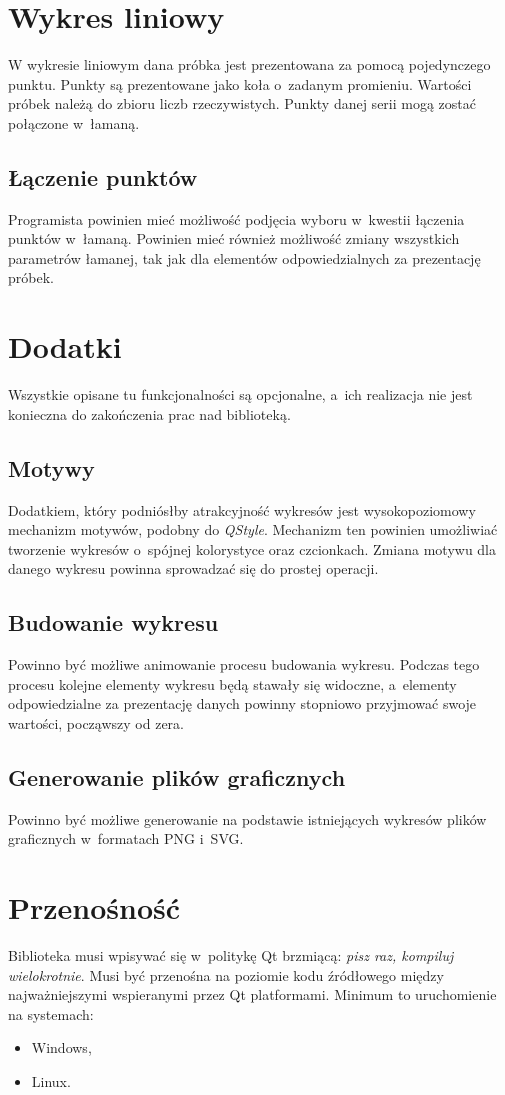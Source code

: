 \section{Wykres liniowy}
W wykresie liniowym dana próbka jest prezentowana za pomocą pojedynczego punktu. Punkty są prezentowane jako koła o~zadanym promieniu. Wartości próbek należą do zbioru liczb rzeczywistych. Punkty danej serii mogą zostać połączone w~łamaną.

\subsection{Łączenie punktów}
Programista powinien mieć możliwość podjęcia wyboru w~kwestii łączenia punktów w~łamaną. Powinien mieć również możliwość zmiany wszystkich parametrów łamanej, tak jak dla elementów odpowiedzialnych za prezentację próbek.

\section{Dodatki}
Wszystkie opisane tu funkcjonalności są opcjonalne, a~ich realizacja nie jest konieczna do zakończenia prac nad biblioteką.

\subsection{Motywy}
Dodatkiem, który podniósłby atrakcyjność wykresów jest wysokopoziomowy mechanizm motywów, podobny do \textit{QStyle}. Mechanizm ten powinien umożliwiać tworzenie wykresów o~spójnej kolorystyce oraz czcionkach. Zmiana motywu dla danego wykresu powinna sprowadzać się do prostej operacji.

\subsection{Budowanie wykresu}
Powinno być możliwe animowanie procesu budowania wykresu. Podczas tego procesu kolejne elementy wykresu będą stawały się widoczne, a~elementy odpowiedzialne za prezentację danych powinny stopniowo przyjmować swoje wartości, począwszy od zera.

\subsection{Generowanie plików graficznych}
Powinno być możliwe generowanie na podstawie istniejących wykresów plików graficznych  w~formatach PNG i~SVG.

\section{Przenośność}
Biblioteka musi wpisywać się w~politykę Qt brzmiącą: \textit{pisz raz, kompiluj wielokrotnie}. Musi być przenośna na poziomie kodu źródłowego między najważniejszymi wspieranymi przez Qt platformami.
Minimum to uruchomienie na systemach:
\begin{itemize}
\item{Windows,}
\item{Linux.}
\end{itemize}


